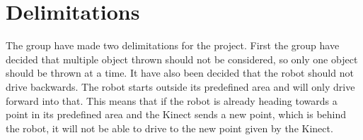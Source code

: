 \section{Delimitations}
\label{sec:Delimitations}
The group have made two delimitations for the project. First the group have decided that multiple object thrown should not be considered, so only one object should be thrown at a time. \newline
It have also been decided that the robot should not drive backwards. The robot starts outside its predefined area and will only drive forward into that. This means that if the robot is already heading towards a point in its predefined area and the Kinect sends a new point, which is behind the robot, it will not be able to drive to the new point given by the Kinect. 